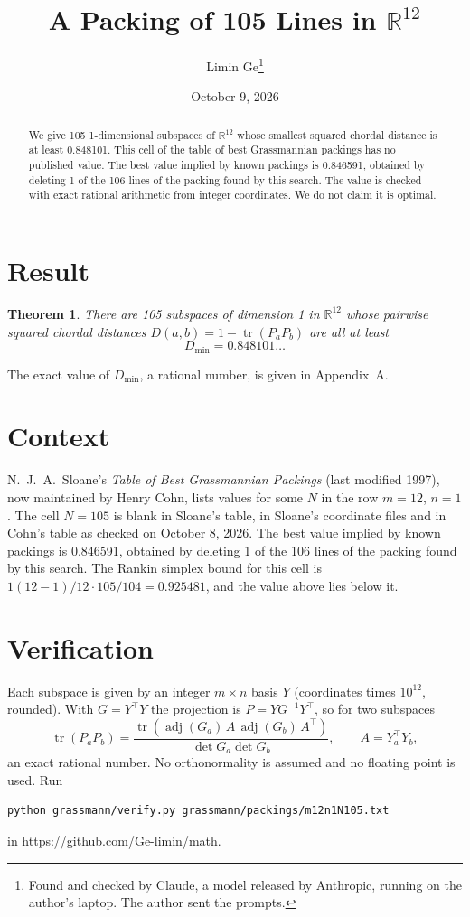 \documentclass[11pt,a4paper]{article}
\title{A Packing of 105 Lines in $\mathbb{R}^{12}$}
\author{Limin Ge\thanks{Found and checked by Claude, a model released by Anthropic, running on the author's laptop. The author sent the prompts.}}
\date{October 9, 2026}
\newtheorem*{theorem}{Theorem}
\begin{document}
\maketitle
\begin{abstract}
We give 105 1-dimensional subspaces of $\mathbb{R}^{12}$ whose smallest squared chordal distance is at least 0.848101. This cell of the table of best Grassmannian packings has no published value. The best value implied by known packings is 0.846591, obtained by deleting 1 of the 106 lines of the packing found by this search. The value is checked with exact rational arithmetic from integer coordinates. We do not claim it is optimal.
\end{abstract}

\section{Result}
\begin{theorem}
There are 105 subspaces of dimension 1 in $\mathbb{R}^{12}$ whose pairwise squared chordal distances $D(a,b) = 1 - \operatorname{tr}(P_aP_b)$ are all at least
\[ D_{\min} = 0.848101\ldots \]
\end{theorem}
The exact value of $D_{\min}$, a rational number, is given in Appendix~A.


\section{Context}
N.~J.~A.~Sloane's \emph{Table of Best Grassmannian Packings} (last modified 1997), now maintained by Henry Cohn, lists values for some $N$ in the row $m=12$, $n=1$. The cell $N=105$ is blank in Sloane's table, in Sloane's coordinate files and in Cohn's table as checked on October 8, 2026. The best value implied by known packings is 0.846591, obtained by deleting 1 of the 106 lines of the packing found by this search. The Rankin simplex bound for this cell is $1(12-1)/12\cdot 105/104 = 0.925481$, and the value above lies below it.


\section{Verification}
Each subspace is given by an integer $m\times n$ basis $Y$ (coordinates times $10^{12}$, rounded). With $G=Y^\top Y$ the projection is $P=YG^{-1}Y^\top$, so for two subspaces
\[ \operatorname{tr}(P_aP_b)=\frac{\operatorname{tr}(\operatorname{adj}(G_a)\,A\,\operatorname{adj}(G_b)\,A^\top)}{\det G_a\det G_b},\qquad A=Y_a^\top Y_b, \]
an exact rational number. No orthonormality is assumed and no floating point is used. Run
\begin{verbatim}
python grassmann/verify.py grassmann/packings/m12n1N105.txt
\end{verbatim}
in \url{https://github.com/Ge-limin/math}.
\end{document}
